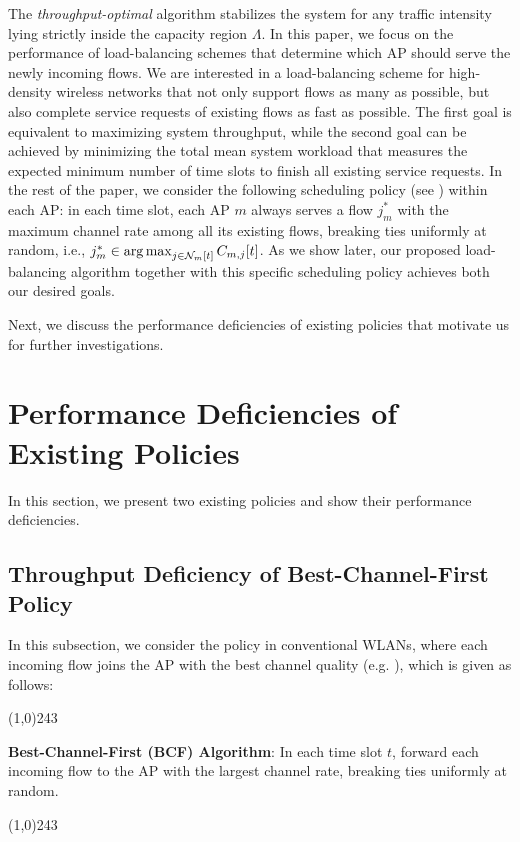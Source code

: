 \documentclass[10pt, conference, letterpaper]{IEEEtran} %
\def\argmax{\operatornamewithlimits{arg\,max}}
\begin{document}
The \emph{throughput-optimal} algorithm stabilizes the system for any traffic intensity lying strictly inside the capacity region $\Lambda$. In this paper, we focus on the performance of load-balancing schemes that determine which AP should serve the newly incoming flows. We are interested in a load-balancing scheme for high-density wireless networks that not only support flows as many as possible, but also complete service requests of existing flows as fast as possible. The first goal is equivalent to maximizing system throughput, while the second goal can be achieved by minimizing the total mean system workload that measures the expected minimum number of time slots to finish all existing service requests. In the rest of the paper, we consider the following scheduling policy (see \cite{borst09}) within each AP: in each time slot, each AP $m$ always serves a flow $j^{*}_{m}$ with the maximum channel rate among all its existing flows, breaking ties uniformly at random, i.e., $j^{*}_{m}\in\argmax_{j\in\mc{N}_m[t]}C_{m,j}[t]$. As we show later, our proposed load-balancing algorithm together with this specific scheduling policy achieves both our desired goals.

Next, we discuss the performance deficiencies of existing policies that motivate us for further investigations.


\section{Performance Deficiencies of Existing Policies}
\label{sec:existing}
In this section, we present two existing policies and show their performance deficiencies. 

\subsection{Throughput Deficiency of Best-Channel-First Policy}
\label{sec:existing:BCF}
In this subsection, we consider the policy in conventional WLANs, where each incoming flow joins the AP with the best channel quality (e.g. \cite{kotz2005analysis}), which is given as follows:

\noindent\line(1,0){243}

\noindent\textbf{Best-Channel-First (BCF) Algorithm}: In each time slot $t$, forward each incoming flow to the AP with the largest channel rate, breaking ties uniformly at random.

\noindent\line(1,0){243}
\end{document}
